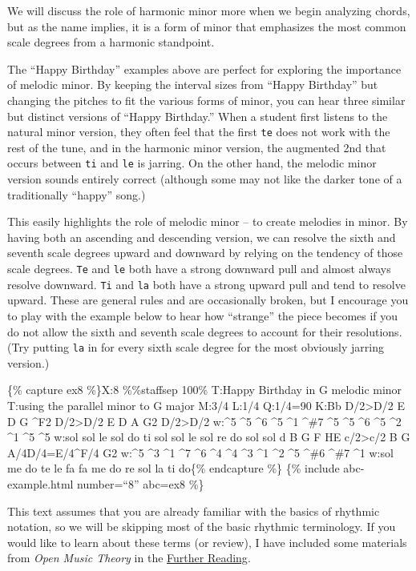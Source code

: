 \documentclass{book}
\begin{document}
We will discuss the role of harmonic minor more when we begin analyzing
chords, but as the name implies, it is a form of minor that emphasizes the
most common scale degrees from a harmonic standpoint.

The ``Happy Birthday'' examples above are perfect for exploring the importance
of melodic minor. By keeping the interval sizes from ``Happy Birthday'' but
changing the pitches to fit the various forms of minor, you can hear three
similar but distinct versions of ``Happy Birthday.'' When a student first
listens to the natural minor version, they often feel that the first
\texttt{te} does not work with the rest of the tune, and in the harmonic minor
version, the augmented 2nd that occurs between \texttt{ti} and \texttt{le} is
jarring. On the other hand, the melodic minor version sounds entirely correct
(although some may not like the darker tone of a traditionally ``happy''
song.)

This easily highlights the role of melodic minor -- to create melodies in
minor. By having both an ascending and descending version, we can resolve the
sixth and seventh scale degrees upward and downward by relying on the tendency
of those scale degrees. \texttt{Te} and \texttt{le} both have a strong
downward pull and almost always resolve downward. \texttt{Ti} and \texttt{la}
both have a strong upward pull and tend to resolve upward. These are general
rules and are occasionally broken, but I encourage you to play with the
example below to hear how ``strange'' the piece becomes if you do not allow
the sixth and seventh scale degrees to account for their resolutions. (Try
putting \texttt{la} in for every sixth scale degree for the most obviously
jarring version.)

\{\% capture ex8 \%\}X:8 \%\%staffsep 100\% T:Happy Birthday in G melodic
minor T:using the parallel minor to G major M:3/4 L:1/4 Q:1/4=90 K:Bb
D/2\textgreater D/2\textbar{} E D G\textbar{} \^{}F2
D/2\textgreater D/2\textbar{} E D A\textbar{} G2 D/2\textgreater D/2\textbar{}
w:\^{}5 \^{}5 \^{}6 \^{}5 \^{}1 \^{}\#7 \^{}5 \^{}5 \^{}6 \^{}5 \^{}2 \^{}1
\^{}5 \^{}5 w:sol sol le sol do ti sol sol le sol re do sol sol d B
G\textbar{} F HE c/2\textgreater c/2\textbar{} B G A/4D/4=E/4\^{}F/4\textbar{}
G2\textbar{]} w:\^{}5 \^{}3 \^{}1 \^{}7 \^{}6 \^{}4 \^{}4 \^{}3 \^{}1 \^{}2
\^{}5 \^{}\#6 \^{}\#7 \^{}1 w:sol me do te le fa fa me do re sol la ti do\{\%
endcapture \%\} \{\% include abc-example.html number=``8'' abc=ex8 \%\}

This text assumes that you are already familiar with the basics of rhythmic
notation, so we will be skipping most of the basic rhythmic terminology. If
you would like to learn about these terms (or review), I have included some
materials from \emph{Open Music Theory} in the
\href{04-intro-rhythm/a2-simplemeter.html}{Further Reading}.
\end{document}
